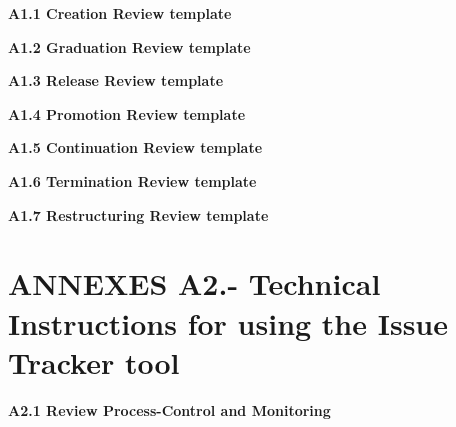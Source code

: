 \documentclass{template/openetcs_article}
\begin{document}
\textbf{A1.1 Creation Review template}

\textbf{A1.2 Graduation Review template}

\textbf{A1.3 Release Review template}

\textbf{A1.4 Promotion Review template}

\textbf{A1.5 Continuation Review template}

\textbf{A1.6 Termination Review template}

\textbf{A1.7 Restructuring Review template}

\section{ANNEXES A2.- Technical Instructions for using the Issue Tracker tool}

\textbf{A2.1 Review Process-Control and Monitoring}
\end{document}
